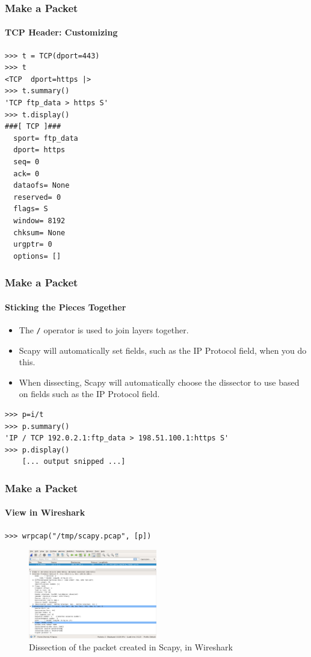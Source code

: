 \documentclass{beamer}
\newcommand{\todo}[1]{{\color{blue}{{\bf todo: }#1}}}
\begin{document}
\begin{frame}[fragile]
\frametitle{Make a Packet}
\framesubtitle{TCP Header: Customizing}
\begin{lstlisting}[caption={Customizing a TCP Header}]
>>> t = TCP(dport=443)
>>> t
<TCP  dport=https |>
>>> t.summary()
'TCP ftp_data > https S'
>>> t.display()
###[ TCP ]### 
  sport= ftp_data
  dport= https
  seq= 0
  ack= 0
  dataofs= None
  reserved= 0
  flags= S
  window= 8192
  chksum= None
  urgptr= 0
  options= []
\end{lstlisting}
\end{frame}


\begin{frame}[fragile]
\frametitle{Make a Packet}
\framesubtitle{Sticking the Pieces Together}
\begin{itemize}
\item{The \texttt{/} operator is used to join layers together.}
\item{Scapy will automatically set fields, such as the IP Protocol field, when
      you do this.}
\item{When dissecting, Scapy will automatically choose the dissector to use
      based on fields such as the IP Protocol field.}
\end{itemize}
\begin{lstlisting}[caption={Sticking the IP and TCP Headers Together}]
>>> p=i/t
>>> p.summary()
'IP / TCP 192.0.2.1:ftp_data > 198.51.100.1:https S'
>>> p.display()
    [... output snipped ...]
\end{lstlisting}
\end{frame}

\begin{frame}[fragile]
\frametitle{Make a Packet}
\framesubtitle{View in Wireshark}
\begin{lstlisting}[caption={Exporting a PCAP File from Scapy}]
>>> wrpcap("/tmp/scapy.pcap", [p])
\end{lstlisting}
\begin{figure}
\includegraphics[width=0.5\textwidth]{scapy-wireshark.png}
\caption{Dissection of the packet created in Scapy, in Wireshark}
\end{figure}
\end{frame}
\end{document}
